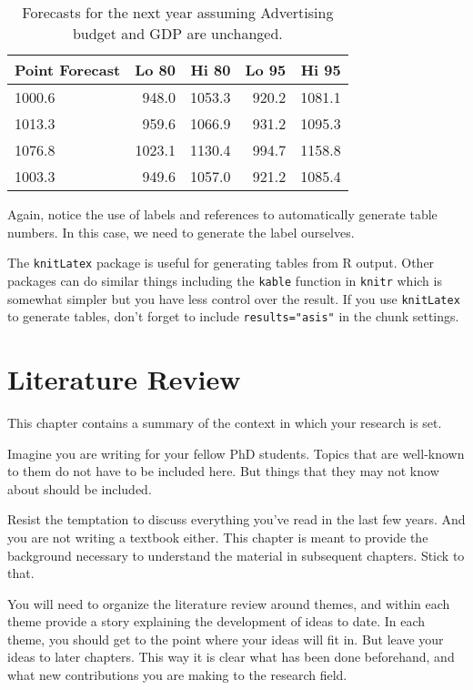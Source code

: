 \documentclass{sydneythesis}
\theoremstyle{definition}
\theoremstyle{definition}
\theoremstyle{definition}
\theoremstyle{remark}
\begin{document}
\begin{table}[ht]
\begin{center}
\begin{tabular}{lrrrr}
\toprule
Point Forecast & Lo 80 & Hi 80 & Lo 95 & Hi 95 \\
\midrule
1000.6 &  948.0 & 1053.3 & 920.2 & 1081.1 \\
1013.3 &  959.6 & 1066.9 & 931.2 & 1095.3 \\
1076.8 & 1023.1 & 1130.4 & 994.7 & 1158.8 \\
1003.3 &  949.6 & 1057.0 & 921.2 & 1085.4 \\
\bottomrule
\end{tabular}
\caption{Forecasts for the next year assuming Advertising budget and GDP are unchanged.}
\label{tab:salesforecasts}
\end{center}
\end{table}

Again, notice the use of labels and references to automatically generate
table numbers. In this case, we need to generate the label ourselves.

The \texttt{knitLatex} package is useful for generating tables from R
output. Other packages can do similar things including the
\texttt{kable} function in \texttt{knitr} which is somewhat simpler but
you have less control over the result. If you use \texttt{knitLatex} to
generate tables, don't forget to include \texttt{results="asis"} in the
chunk settings.

\chapter{Literature Review}\label{ch:litreview}

This chapter contains a summary of the context in which your research is
set.

Imagine you are writing for your fellow PhD students. Topics that are
well-known to them do not have to be included here. But things that they
may not know about should be included.

Resist the temptation to discuss everything you've read in the last few
years. And you are not writing a textbook either. This chapter is meant
to provide the background necessary to understand the material in
subsequent chapters. Stick to that.

You will need to organize the literature review around themes, and
within each theme provide a story explaining the development of ideas to
date. In each theme, you should get to the point where your ideas will
fit in. But leave your ideas to later chapters. This way it is clear
what has been done beforehand, and what new contributions you are making
to the research field.
\end{document}
